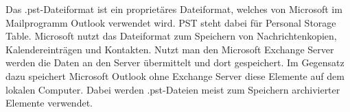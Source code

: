 Das .pst-Dateiformat ist ein proprietäres Dateiformat, welches von Microsoft im Mailprogramm \glqq{}Outlook\grqq{} verwendet wird. PST steht dabei für Personal Storage Table. Microsoft nutzt das Dateiformat zum Speichern von Nachrichtenkopien, Kalendereinträgen und Kontakten. Nutzt man den Microsoft Exchange Server werden die Daten an den Server übermittelt und dort gespeichert. Im Gegensatz dazu speichert Microsoft Outlook ohne Exchange Server diese Elemente auf dem lokalen Computer. Dabei werden .pst-Dateien meist zum Speichern archivierter Elemente verwendet.